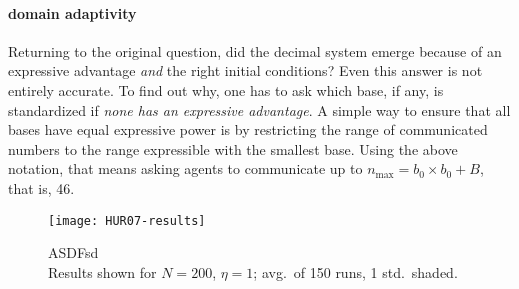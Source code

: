 \documentclass{../src/bcthesispart}
\begin{document}
\paragraph{domain adaptivity}
Returning to the original question, did the decimal system emerge because of an expressive advantage \emph{and} the right initial conditions? 
Even this answer is not entirely accurate.
To find out why, one has to ask which base, if any, is standardized if \emph{none has an expressive advantage}. 
A simple way to ensure that all bases have equal expressive power is by restricting the range of communicated numbers to the range expressible with the smallest base.
Using the above notation, that means asking agents to communicate up to $n_{\text{max}} = b_0\times b_0 + B$, that is, 46.



\begin{SCfigure}
	\texttt{[image: HUR07-results]}	
	\caption{ASDFsd
		\\[1em]
		Results shown for $N=200$, $\eta=1$; avg.\ of 150 runs, 1 std.\ shaded.
		\label{fig:effect-n-max}}
\end{SCfigure}
\end{document}
